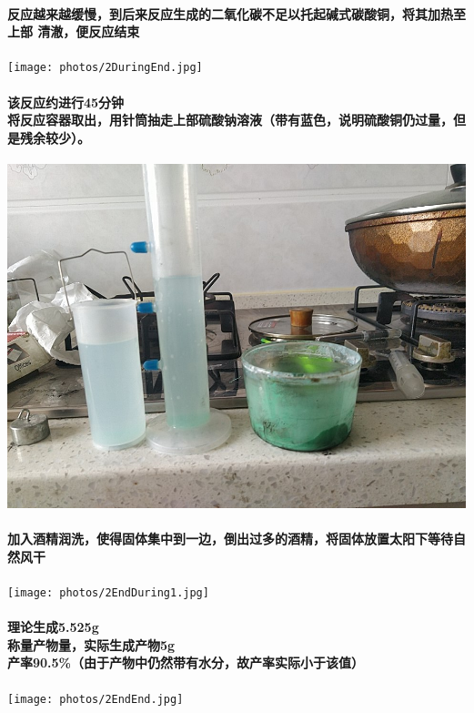 \documentclass[final,11pt,oneside,UTF8]{report}
\begin{document}
\paragraph{
    反应越来越缓慢，到后来反应生成的二氧化碳不足以托起碱式碳酸铜，将其加热至上部
    清澈，便反应结束\\
}
\begin{center}
    \texttt{[image: photos/2DuringEnd.jpg]}
\end{center}
\paragraph{
    该反应约进行45分钟\\
    将反应容器取出，用针筒抽走上部硫酸钠溶液（带有蓝色，说明硫酸铜仍过量，但是残余较少）。
}
\begin{center}
    \includegraphics[scale=0.3,angle=90]{photos/2End1.jpg}
\end{center}
\paragraph{
    加入酒精润洗，使得固体集中到一边，倒出过多的酒精，将固体放置太阳下等待自然风干\\
}
\begin{center}
    \texttt{[image: photos/2EndDuring1.jpg]}
\end{center}
\paragraph{
    理论生成5.525g\\
    称量产物量，实际生成产物5g\\
    产率90.5\%（由于产物中仍然带有水分，故产率实际小于该值）\\
}
\begin{center}
    \texttt{[image: photos/2EndEnd.jpg]}
\end{center}
\end{document}
